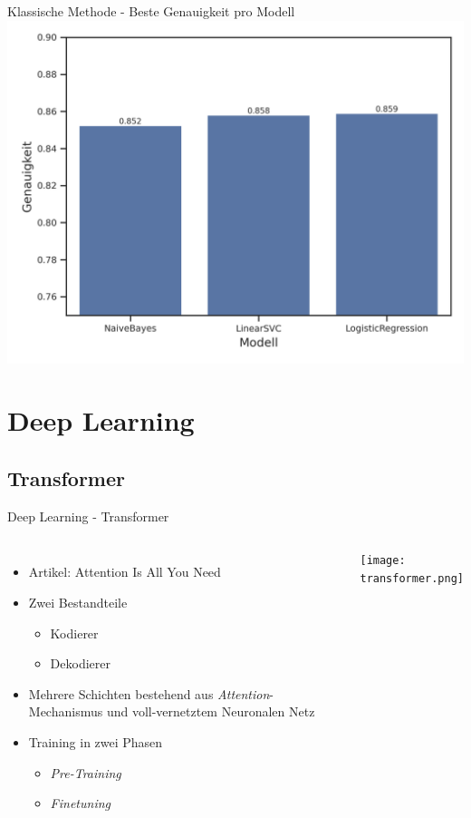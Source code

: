\documentclass[aspectratio=169]{beamer}
\begin{document}
\begin{frame}{Klassische Methode - Beste Genauigkeit pro Modell}
	\centering
	\includegraphics[scale=0.65]{../datasets/sentiment140/results/plots/klassische-ml-beste-genauigkeit-pro-modell-truncated-y-axis.png}
\end{frame}


\section{Deep Learning}

\subsection{Transformer}

\begin{frame}{Deep Learning - Transformer}
	\begin{columns}[T]
		\begin{itemize}
			\item Artikel: \glqq Attention Is All You Need\grqq
			\item Zwei Bestandteile
			\begin{itemize}
				\item Kodierer 
				\item Dekodierer 
			\end{itemize}
			\item Mehrere Schichten bestehend aus \textit{Attention}-Mechanismus und voll-vernetztem Neuronalen Netz
			\item Training in zwei Phasen
			\begin{itemize}
				\item \textit{Pre-Training}
				\item \textit{Finetuning}
			\end{itemize}
		\end{itemize}
		\centering
		\texttt{[image: transformer.png]}
	\end{columns}
\end{frame}
\end{document}
